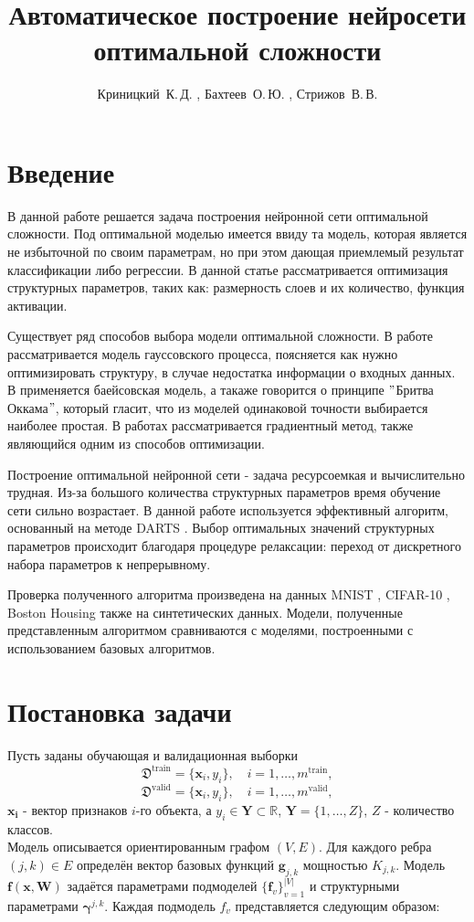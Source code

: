 \documentclass[12pt, twoside]{article}
\title
    {Автоматическое построение нейросети оптимальной сложности }
\author
    {Криницкий~К.\,Д. , Бахтеев~О.\,Ю. , Стрижов~В.\,В.}
\begin{document}
\maketitle

\section{Введение}
  В данной работе решается задача построения нейронной сети оптимальной сложности. Под оптимальной моделью имеется ввиду та модель, которая является не избыточной по своим параметрам, но при этом дающая приемлемый результат классификации либо регрессии. В данной статье рассматривается оптимизация структурных параметров, таких как: размерность слоев и их количество, функция активации.
  \par Существует ряд способов выбора модели оптимальной сложности. В работе \cite{GaussianModel} рассматривается модель гауссовского процесса, поясняется как нужно оптимизировать структуру, в случае недостатка информации о входных данных. В \cite{BayesianModel} применяется баейсовская модель, а такаже говорится о принципе $"$Бритва Оккама$"$, который гласит, что из моделей одинаковой точности выбирается наиболее простая. В работах \cite{Gradient1,Gradient2,Gradient3,Gradient4} рассматривается градиентный метод, также являющийся одним из способов оптимизации. 
  \par Построение оптимальной нейронной сети - задача ресурсоемкая и вычислительно трудная. Из-за большого количества структурных параметров время обучение сети сильно возрастает. В данной работе используется эффективный алгоритм, основанный на методе DARTS \cite{DARTS}. Выбор оптимальных значений структурных параметров происходит благодаря процедуре релаксации: переход от дискретного набора параметров к непрерывному.
  \par Проверка полученного алгоритма произведена на данных MNIST \cite{MNIST}, CIFAR-10 \cite{CIFAR}, Boston Housing \cite{Boston} также на синтетических данных. Модели, полученные представленным алгоритмом сравниваются с моделями, построенными с использованием базовых алгоритмов.



\section{Постановка задачи}
Пусть заданы обучающая и валидационная выборки
$$
\mathfrak{D}^{\text{train}} = \{\mathbf{x}_i, y_i\}, \quad i=1,\dots,m^{\text{train}},
$$
$$
\mathfrak{D}^{\text{valid}} = \{\mathbf{x}_i, y_i\}, \quad i=1,\dots,m^{\text{valid}},
$$
$\mathbf{x_i}$ - вектор признаков $i$-го объекта, а $y_i\in\mathbf{Y}\subset\mathbb{R}$, $\mathbf{Y} = \{1,\dots,Z\}$, $Z$ - количество классов.\\
Модель описывается ориентированным графом $(V, E)$. Для каждого ребра $(j, k) \in E$ определён вектор базовых функций $\textbf{g}_{j, k}$ мощностью $K_{j, k}$. Модель $\textbf{f}(\textbf{x}, \textbf{W})$ задаётся параметрами подмоделей $\{\textbf{f}_{v}\}_{v = 1}^{|V|}$ и структурными параметрами $\boldsymbol{\gamma}^{j,k}$.  
	Каждая подмодель $f_{v}$ представляется следующим образом:
	
\end{document}
